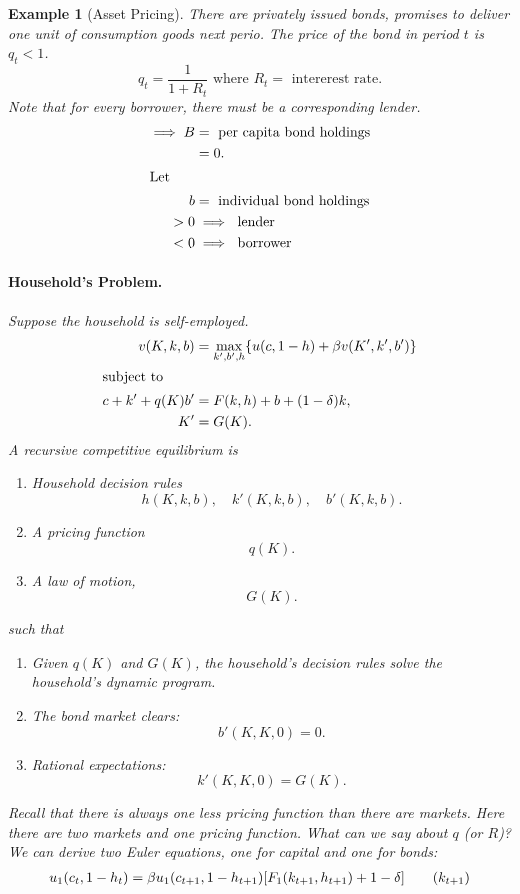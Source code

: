 \documentclass[11pt]{article}
\newtheorem*{example}{Example}
\begin{document}
\begin{example}[Asset Pricing]
There are privately issued bonds, promises to deliver one unit of consumption goods next perio. The price of the bond in period $t$ is $q_t < 1$.
\[
q_t = \frac{1}{1 + R_t} \text{ where } R_t = \text{ intererest rate.}
\]
Note that for every borrower, there must be a corresponding lender.
\begin{align*}
\implies B &= \text{ per capita bond holdings}\\
&= 0.\\
\intertext{Let}
b &= \text{ individual bond holdings}\\
> 0 &\implies \text{ lender}\\
< 0 &\implies \text{ borrower}
\end{align*}
\paragraph{Household's Problem.} Suppose the household is self-employed.
\begin{align*}
v(K, k, b) &= \max_{k', b', h} \{u(c, 1 - h) + \beta v(K', k', b')\}\\
\intertext{subject to}
c + k' + q(K)b' &= F(k, h) + b + (1 - \delta)k,\\
K' &= G(K).
\end{align*}
A recursive competitive equilibrium is
\begin{enumerate}[label=(\alph*)]
\item Household decision rules
\[
h(K, k, b),\quad k'(K, k, b), \quad b'(K, k, b).
\]
\item A pricing function
\[
q(K).
\]
\item A law of motion, 
\[
G(K).
\]
\end{enumerate}
such that
\begin{enumerate}
\item Given $q(K)$ and $G(K)$, the household's decision rules solve the household's dynamic program.  
\item The bond market clears:
\[
b'(K, K, 0) = 0.
\]
\item Rational expectations:
\[
k'(K, K, 0) = G(K).
\]
\end{enumerate}
Recall that there is always one less pricing function than there are markets. Here there are two markets and one pricing function. What can we say about $q$ (or $R$)? We can derive two Euler equations, one for capital and one for bonds:
\begin{align*}
u_1(c_t, 1 - h_t) &= \beta u_1(c_{t+ 1}, 1 - h_{t + 1})[F_1(k_{t + 1}, h_{t + 1}) + 1 - \delta] \tag{$k_{t + 1}$}\\

\end{align*}
\end{example}
\end{document}
